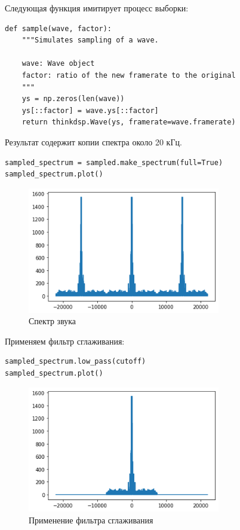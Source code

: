\documentclass[a4paper,12pt]{report}
\begin{document}
Следующая функция имитирует процесс выборки:

\begin{lstlisting}[caption=Функция \texttt{sample}]
def sample(wave, factor):
    """Simulates sampling of a wave.
    
    wave: Wave object
    factor: ratio of the new framerate to the original
    """
    ys = np.zeros(len(wave))
    ys[::factor] = wave.ys[::factor]
    return thinkdsp.Wave(ys, framerate=wave.framerate)
\end{lstlisting}

Результат содержит копии спектра около 20 кГц.

\begin{lstlisting}[caption=Спектр звука]
sampled_spectrum = sampled.make_spectrum(full=True)
sampled_spectrum.plot()
\end{lstlisting}

\begin{figure}[H]
        \centering
        \includegraphics[width=0.75\textwidth]{4.png}
        \caption{Спектр звука}
        \label{4}
\end{figure}

Применяем фильтр сглаживания:

\begin{lstlisting}[caption=Применение фильтра сглаживания]
sampled_spectrum.low_pass(cutoff)
sampled_spectrum.plot()
\end{lstlisting}

\begin{figure}[H]
        \centering
        \includegraphics[width=0.75\textwidth]{5.png}
        \caption{Применение фильтра сглаживания}
        \label{5}
\end{figure}
\end{document}
